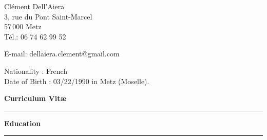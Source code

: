 \documentclass[a4paper,11pt]{article}
\newcommand{\titre}[1]{%
	\begin{center}
	\bigskip
	\rule{\textwidth}{1pt}
	\par\vspace{0.1cm}
        \textbf{\large #1}
	\par\rule{\textwidth}{1pt}
	\end{center}
	\bigskip
	}
\begin{document}
\begin{flushleft}
Clément Dell'Aiera \\
3, rue du Pont Saint-Marcel\\
57\,000 Metz \\

\medskip
Tél.: 06 74 62 99 52

E-mail: dellaiera.clement@gmail.com


\end{flushleft}
\begin{flushleft}
Nationality : French \\
Date of Birth : 03/22/1990 in Metz (Moselle).
\end{flushleft}

\vspace{1.5cm}
\begin{center}
\par\huge{\textbf{Curriculum Vit\ae} }
\end{center}

\titre{Education}
\end{document}

